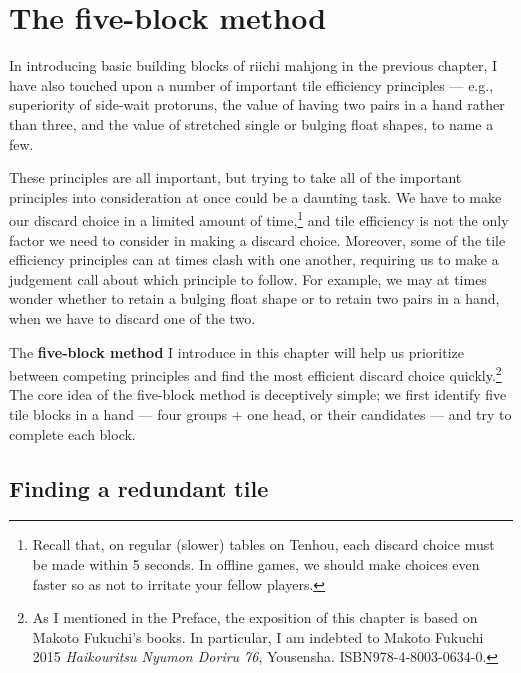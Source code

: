 
\chapter{The five-block method} \label{ch:five}
\thispagestyle{empty}

In introducing basic building blocks of riichi mahjong in the previous chapter, I have also touched upon a number of important tile efficiency principles ---
e.g., superiority of side-wait protoruns, the value of having two pairs in a hand rather than three, and the value of stretched single or bulging float shapes, to name a few. 

\bigskip
These principles are all important, but trying to take all of the important principles into consideration at once could be a daunting task. We have to make our discard choice in a limited amount of time,\footnote{Recall that, on regular (slower) tables on {\jap Tenhou}, each discard choice must be made within 5 seconds. In offline games, we should make choices even faster so as not to irritate your fellow players.} and tile efficiency is not the only factor we need to consider in making a discard choice. 
Moreover, some of the tile efficiency principles can at times clash with one another, requiring us to make a judgement call about which principle to follow. For example, we may at times wonder whether to retain a bulging float shape or to retain two pairs in a hand, when we have to discard one of the two. 

\bigskip
The {\bf five-block method} I introduce in this chapter will help us prioritize between competing principles and find the most efficient discard choice quickly.\footnote{As I mentioned in the Preface, the exposition of this chapter is based on Makoto Fukuchi's books. In particular, I am indebted to Makoto Fukuchi 2015 \textit{Haikouritsu Nyumon Doriru 76}, Yousensha. ISBN978-4-8003-0634-0.}
The core idea of the five-block method is deceptively simple; we first identify five tile blocks in a hand --- four groups + one head, or their candidates --- and try to complete each block. 

\section{Finding a redundant tile} 

